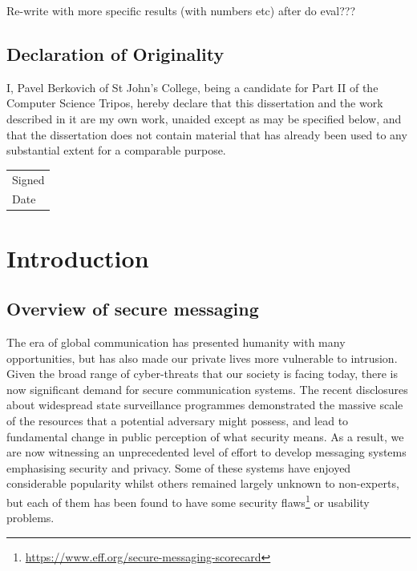 \documentclass[a4paper, twoside, 12pt]{report}
\newcommand{\skippage}{\newpage\null\newpage}
\begin{document}
{\color{red} 
Re-write with more specific results (with numbers etc) after do eval???}

\pagebreak
\skippage

\section*{Declaration of Originality}
I, Pavel Berkovich of St John's College, being a candidate for Part II of the Computer Science Tripos, hereby declare that this dissertation and the work described in it are my own work, unaided except as may be specified below, and that the dissertation does not contain material that has already been used to any substantial extent for a comparable purpose. \\[0.8cm]
\begin{tabular}{l}
    Signed \\[0.8cm]
    Date
\end{tabular}
\vfill

\skippage

\tableofcontents

\skippage

\pagestyle{headings}

\chapter{Introduction}
\label{ch:intro}

\section{Overview of secure messaging}
\label{sec:intro.overview_sec_mess}
The era of global communication has presented humanity with many opportunities, but has also made our private lives more vulnerable to intrusion. Given the broad range of cyber-threats that our society is facing today, there is now significant demand for secure communication systems. The recent disclosures about widespread state surveillance programmes demonstrated the massive scale of the resources that a potential adversary might possess, and lead to fundamental change in public perception of what security means. As a result, we are now witnessing an unprecedented level of effort to develop messaging systems emphasising security and privacy. Some of these systems have enjoyed considerable popularity whilst others remained largely unknown to non-experts, but each of them has been found to have some security flaws\footnote{\url{https://www.eff.org/secure-messaging-scorecard}} or usability problems.\\
\end{document}
